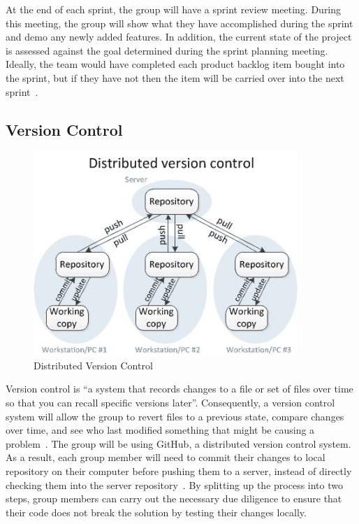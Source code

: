 At the end of each sprint, the group will have a sprint review meeting. During this meeting, the group will show what they have accomplished during the sprint and demo any newly added features. In addition, the current state of the project is assessed against the goal determined during the sprint planning meeting. Ideally, the team would have completed each product backlog item bought into the sprint, but if they have not then the item will be carried over into the next sprint~\parencite{web:scrum_sprint}.

\subsection{Version Control}

\begin{figure}
  \centering
  \begin{minipage}{10cm}
    \centering
    \includegraphics[width=10cm]{inc/distributed_version_control.jpg}
    \caption{Distributed Version Control}
    \label{fig:distributed_version_control}
  \end{minipage}
\end{figure}

Version control is ``a system that records changes to a file or set of files over time so that you can recall specific versions later''. Consequently, a version control system will allow the group to revert files to a previous state, compare changes over time, and see who last modified something that might be causing a problem~\parencite{web:git}. The group will be using GitHub, a distributed version control system. As a result, each group member will need to commit their changes to local repository on their computer before pushing them to a server, instead of directly checking them into the server repository~\parencite{book:pro_tfs}. By splitting up the process into two steps, group members can carry out the necessary due diligence to ensure that their code does not break the solution by testing their changes locally.

